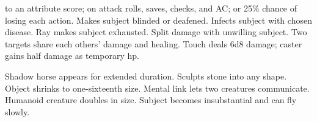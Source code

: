 \begin{swspelllist}
  to an attribute score;  on attack rolls, saves, checks, and AC; or 25\% chance of losing each action.
 Makes subject blinded or deafened.
 Infects subject with chosen disease.
 Ray makes subject exhausted.
 Split damage with unwilling subject.
 Two targets share each others' damage and healing.
 Touch deals 6d8 damage; caster gains half damage as temporary hp.

 Shadow horse appears for extended duration.
 Sculpts stone into any shape.
 Object shrinks to one-sixteenth size.
 Mental link lets two creatures communicate.
 Humanoid creature doubles in size.
 Subject becomes insubstantial and can fly slowly.
\end{swspelllist}

